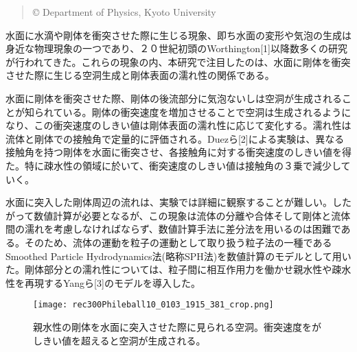 \documentclass[a4paper]{jsarticle}
\begin{document}
\begin{center}
\begin{abstract}
{%
\hspace{-4pt}
{\fontsize{10.5pt}{12.6pt}\selectfont \copyright}
{\fontsize{10.5pt}{12.6pt} Department of Physics, Kyoto University}
}
\end{abstract}
\end{center}
\vspace{5pt}
{\fontsize{10.5pt}{14pt}\selectfont 

 水面に水滴や剛体を衝突させた際に生じる現象、即ち水面の変形や気泡の生成は身近な物理現象の一つであり、２０世紀初頭のWorthington[1]以降数多くの研究が行われてきた。これらの現象の内、本研究で注目したのは、水面に剛体を衝突させた際に生じる空洞生成と剛体表面の濡れ性の関係である。

 水面に剛体を衝突させた際、剛体の後流部分に気泡ないしは空洞が生成されることが知られている。剛体の衝突速度を増加させることで空洞は生成されるようになり、この衝突速度のしきい値は剛体表面の濡れ性に応じて変化する。濡れ性は流体と剛体での接触角で定量的に評価される。Duezら[2]による実験は、異なる接触角を持つ剛体を水面に衝突させ、各接触角に対する衝突速度のしきい値を得た。特に疎水性の領域に於いて、衝突速度のしきい値は接触角の３乗で減少していく。

 水面に突入した剛体周辺の流れは、実験では詳細に観察することが難しい。したがって数値計算が必要となるが、この現象は流体の分離や合体そして剛体と流体間の濡れを考慮しなければならず、数値計算手法に差分法を用いるのは困難である。そのため、流体の運動を粒子の運動として取り扱う粒子法の一種であるSmoothed Particle Hydrodynamics法(略称SPH法)を数値計算のモデルとして用いた。剛体部分との濡れ性については、粒子間に相互作用力を働かせ親水性や疎水性を再現するYangら[3]のモデルを導入した。

 \begin{figure}[h]
   \begin{center}
     \texttt{[image: rec300Phileball10\_0103\_1915\_381\_crop.png]}
     \caption{親水性の剛体を水面に突入させた際に見られる空洞。衝突速度をがしきい値を超えると空洞が生成される。}
   \end{center}
 \end{figure}

}
\end{document}
